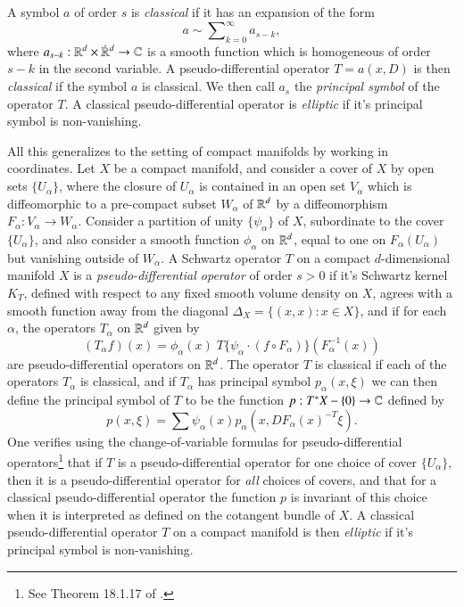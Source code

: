 A symbol $a$ of order $s$ is \emph{classical} if it has an expansion of the form
%
\begin{equation}
    a \sim \sum\nolimits_{k = 0}^\infty a_{s - k},
\end{equation}
%
where $a_{s-k}: {\RR^d} \times  {\dot{\RR}{\vphantom{\RR}}^d} \to \CC$ is a smooth function which is homogeneous of order $s - k$ in the second variable. A pseudo-differential operator $T = a(x,D)$ is then \emph{classical} if the symbol $a$ is classical. We then call $a_s$ the \emph{principal symbol} of the operator $T$. A classical pseudo-differential operator is \emph{elliptic} if it's principal symbol is non-vanishing.

All this generalizes to the setting of compact manifolds by working in coordinates. Let $X$ be a compact manifold, and consider a cover of $X$ by open sets $\{ U_\alpha \}$, where the closure of $U_\alpha$ is contained in an open set $V_\alpha$ which is diffeomorphic to a pre-compact subset $W_\alpha$ of $\operatorname{\mathbb{R}}^d$ by a diffeomorphism $F_\alpha: V_\alpha \to W_\alpha$. Consider a partition of unity $\{ \psi_\alpha \}$ of $X$, subordinate to the cover $\{ U_\alpha \}$, and also consider a smooth function $\phi_\alpha$ on $\operatorname{\mathbb{R}}^d$, equal to one on $F_\alpha(U_\alpha)$ but vanishing outside of $W_\alpha$. A Schwartz operator $T$ on a compact $d$-dimensional manifold $X$ is a \emph{pseudo-differential operator} of order $s > 0$ if it's Schwartz kernel $K_T$, defined with respect to any fixed smooth volume density on $X$, agrees with a smooth function away from the diagonal $\Delta_X = \{ (x,x): x \in X \}$, and if for each $\alpha$, the operators $T_\alpha$ on $\operatorname{\mathbb{R}}^d$ given by
%
\begin{equation}
    (T_\alpha f)(x) = \phi_\alpha(x)\; T \{ \psi_\alpha \cdot (f \circ F_\alpha) \} (F_\alpha^{-1}(x))
\end{equation}
%
are pseudo-differential operators on $\operatorname{\mathbb{R}}^d$. The operator $T$ is classical if each of the operators $T_\alpha$ is classical, and if $T_\alpha$ has principal symbol $p_\alpha(x,\xi)$ we can then define the principal symbol of $T$ to be the function $p: T^* X - \{ 0 \} \to \operatorname{\mathbb{C}}$ defined by
%
\begin{equation}
    p(x,\xi) = \sum \psi_\alpha(x) p_\alpha(x, DF_\alpha(x)^{-T} \xi).
\end{equation}
%
One verifies using the change-of-variable formulas for pseudo-differential operators\footnote{See Theorem 18.1.17 of \cite{Hormander3}.} that if $T$ is a pseudo-differential operator for one choice of cover $\{ U_\alpha \}$, then it is a pseudo-differential operator for \emph{all} choices of covers, and that for a classical pseudo-differential operator the function $p$ is invariant of this choice when it is interpreted as defined on the cotangent bundle of $X$. A classical pseudo-differential operator $T$ on a compact manifold is then \emph{elliptic} if it's principal symbol is non-vanishing.